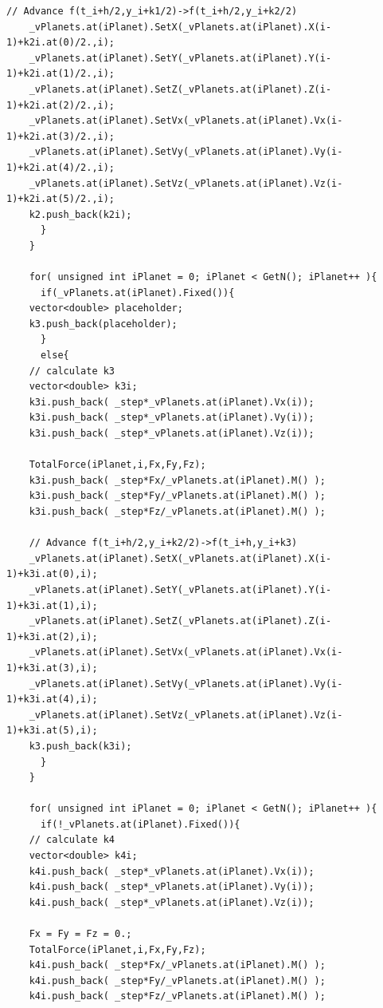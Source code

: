 \documentclass[a4paper,12pt]{report}
\begin{document}
\begin{Verbatim}[fontsize=\small]
	// Advance f(t_i+h/2,y_i+k1/2)->f(t_i+h/2,y_i+k2/2)
	_vPlanets.at(iPlanet).SetX(_vPlanets.at(iPlanet).X(i-1)+k2i.at(0)/2.,i);
	_vPlanets.at(iPlanet).SetY(_vPlanets.at(iPlanet).Y(i-1)+k2i.at(1)/2.,i);
	_vPlanets.at(iPlanet).SetZ(_vPlanets.at(iPlanet).Z(i-1)+k2i.at(2)/2.,i);
	_vPlanets.at(iPlanet).SetVx(_vPlanets.at(iPlanet).Vx(i-1)+k2i.at(3)/2.,i);
	_vPlanets.at(iPlanet).SetVy(_vPlanets.at(iPlanet).Vy(i-1)+k2i.at(4)/2.,i);
	_vPlanets.at(iPlanet).SetVz(_vPlanets.at(iPlanet).Vz(i-1)+k2i.at(5)/2.,i);
	k2.push_back(k2i);
      }
    }
  
    for( unsigned int iPlanet = 0; iPlanet < GetN(); iPlanet++ ){
      if(_vPlanets.at(iPlanet).Fixed()){
	vector<double> placeholder;
	k3.push_back(placeholder);
      }
      else{
	// calculate k3
	vector<double> k3i;
	k3i.push_back( _step*_vPlanets.at(iPlanet).Vx(i));
	k3i.push_back( _step*_vPlanets.at(iPlanet).Vy(i));
	k3i.push_back( _step*_vPlanets.at(iPlanet).Vz(i));

	TotalForce(iPlanet,i,Fx,Fy,Fz);
	k3i.push_back( _step*Fx/_vPlanets.at(iPlanet).M() );
	k3i.push_back( _step*Fy/_vPlanets.at(iPlanet).M() );
	k3i.push_back( _step*Fz/_vPlanets.at(iPlanet).M() );

	// Advance f(t_i+h/2,y_i+k2/2)->f(t_i+h,y_i+k3)
	_vPlanets.at(iPlanet).SetX(_vPlanets.at(iPlanet).X(i-1)+k3i.at(0),i);
	_vPlanets.at(iPlanet).SetY(_vPlanets.at(iPlanet).Y(i-1)+k3i.at(1),i);
	_vPlanets.at(iPlanet).SetZ(_vPlanets.at(iPlanet).Z(i-1)+k3i.at(2),i);
	_vPlanets.at(iPlanet).SetVx(_vPlanets.at(iPlanet).Vx(i-1)+k3i.at(3),i);
	_vPlanets.at(iPlanet).SetVy(_vPlanets.at(iPlanet).Vy(i-1)+k3i.at(4),i);
	_vPlanets.at(iPlanet).SetVz(_vPlanets.at(iPlanet).Vz(i-1)+k3i.at(5),i);
	k3.push_back(k3i);
      }
    }

    for( unsigned int iPlanet = 0; iPlanet < GetN(); iPlanet++ ){
      if(!_vPlanets.at(iPlanet).Fixed()){
	// calculate k4
	vector<double> k4i;
	k4i.push_back( _step*_vPlanets.at(iPlanet).Vx(i));
	k4i.push_back( _step*_vPlanets.at(iPlanet).Vy(i));
	k4i.push_back( _step*_vPlanets.at(iPlanet).Vz(i));

	Fx = Fy = Fz = 0.;
	TotalForce(iPlanet,i,Fx,Fy,Fz);
	k4i.push_back( _step*Fx/_vPlanets.at(iPlanet).M() );
	k4i.push_back( _step*Fy/_vPlanets.at(iPlanet).M() );
	k4i.push_back( _step*Fz/_vPlanets.at(iPlanet).M() );


\end{Verbatim}
\end{document}
